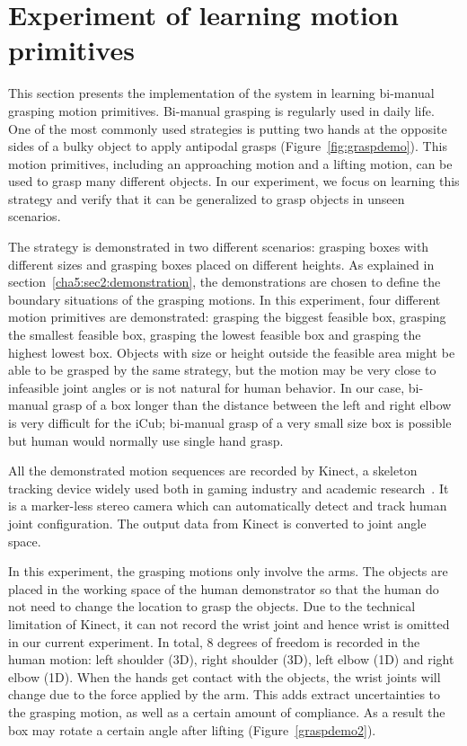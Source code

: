 \section{Experiment of learning motion primitives}
\label{cha5:sec3}




This section presents the implementation of the system in learning bi-manual grasping motion primitives. Bi-manual grasping is regularly used in daily life. One of the most commonly used strategies is putting two hands at the opposite sides of a bulky object to apply antipodal grasps (Figure~\ref{fig:graspdemo}). This motion primitives, including an approaching motion and a lifting motion, can be used to grasp many different objects. In our experiment, we focus on learning this strategy and verify that it can be generalized to grasp objects in unseen scenarios.

The strategy is demonstrated in two different scenarios: grasping boxes with different sizes and grasping boxes placed on different heights. As explained in section~\ref{cha5:sec2:demonstration}, the demonstrations are chosen to define the boundary situations of the grasping motions. In this experiment, four different motion primitives are demonstrated: grasping the biggest feasible box,  grasping the smallest feasible box, grasping the lowest feasible box and grasping the highest lowest box. Objects with size or height outside the feasible area might be able to be grasped by the same strategy, but the motion may be very close to infeasible joint angles or is not natural for human behavior. In our case, bi-manual grasp of a box longer than the distance between the left and right elbow is very difficult for the iCub; bi-manual grasp of a very small size box is possible but human would normally use single hand grasp.

All the demonstrated motion sequences are recorded by Kinect, a skeleton tracking device widely used both in gaming industry and academic research~\citep{ren20123d}. It is a marker-less stereo camera which can automatically detect and track human joint configuration. The output data from Kinect is converted to joint angle space.

In this experiment, the grasping motions only involve the arms. The objects are placed in the working space of the human demonstrator so that the human do not need to change the location to grasp the objects. Due to the technical limitation of Kinect, it can not record the wrist joint and hence wrist is omitted in our current experiment. In total, 8 degrees of freedom is recorded in the human motion: left shoulder (3D), right shoulder (3D), left elbow (1D) and right elbow (1D). When the hands get contact with the objects, the wrist joints will change due to the force applied by the arm. This adds extract uncertainties to the grasping motion, as well as a certain amount of compliance. As a result the box may rotate a certain angle after lifting (Figure~\ref{graspdemo2}).


